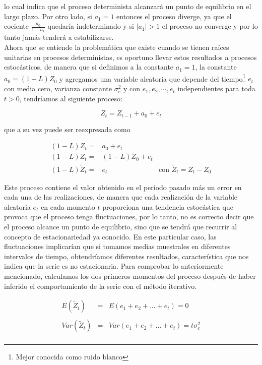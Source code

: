 lo cual  indica que el proceso determinista alcanzará un punto de equilibrio en el largo plazo. Por otro lado, si $a_1=1$ entonces el proceso diverge, ya que el cociente $\frac{a_0}{1-a_1}$ quedaría indeterminado y si  $\left | a_1 \right |>1$ el proceso no converge y por lo tanto jamás tenderá a estabilizarse.\\

Ahora que se entiende la problemática que existe cuando se tienen raíces unitarias en procesos deterministas, es oportuno llevar estos resultados a procesos estocásticos, de manera que si definimos a la constante $a_1=1$, la constante $a_0=(1-L)Z_0$ y agregamos una variable aleatoria que depende del tiempo\footnote{ Mejor conocida como ruido blanco} $e_t$ con media cero, varianza constante $\sigma_e^2$ y con $e_1,e_2,\cdots, e_t$ independientes para toda $t>0$, tendríamos al siguiente proceso:

\begin{equation}
Z_t= Z_{t-1} + a_0 + e_t
\end{equation} 

que a su vez puede ser reexpresada como

\begin{eqnarray}\label{eq:AR1} 
(1-L)Z_t =& a_0 + e_t & \nonumber \\
(1-L)Z_t =& (1-L)Z_0 + e_t & \nonumber \\
(1-L)\tilde{Z}_t =& e_t & \mbox{con $\tilde{Z}_t =Z_t-Z_0$}
\end{eqnarray}
 

Este proceso contiene el valor obtenido en el periodo pasado más un error en cada una de las realizaciones, de manera que cada realización de la variable aleatoria ${e_t}$ en cada momento $t$ proporciona una tendencia estocástica que provoca que el proceso tenga fluctuaciones, por lo tanto, no es correcto decir que el proceso alcance un punto de equilibrio, sino que se tendrá que recurrir al concepto de estacionariedad ya conocido. En este particular caso, las fluctuaciones implicarían que si tomamos medias muestrales en diferentes intervalos de tiempo, obtendríamos diferentes resultados, característica  que nos indica que la serie es no estacionaria. Para comprobar lo anteriormente mencionado, calculamos los dos primeros momentos del proceso después de haber inferido el comportamiento de la serie con el m\'etodo iterativo.

 \begin{eqnarray}
 E(\tilde{Z}_t) &  =&   E(e_1+ e_2+...+e_t)= 0 \nonumber  \\ 
         &  &    \\
         Var(\tilde{Z}_t) & =& Var(e_1+e_2+...+e_t)=t \sigma_e^2  \nonumber \\
 & &  \nonumber 
\end{eqnarray} 


